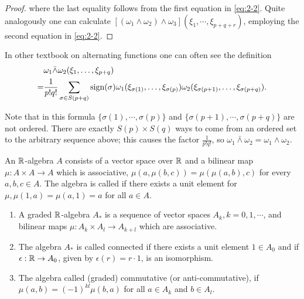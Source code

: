\begin{proof}
  where the last equality follows from the first equation in \eqref{eq:2-2}. Quite analogously one can calculate
  $[(\omega_1\wedge\omega_2)\wedge\omega_3](\xi_1, \cdots, \xi_{p+q+r})$, employing the second equation in \eqref{eq:2-2}.
\end{proof}

\begin{remark}
In other textbook on alternating functions one can often see the definition
\begin{align*}
    & \omega_{1}\bar{\wedge}\omega_{2}(\xi_{1},\ldots,\xi_{p+q})\\
  = & \frac{1}{p!q!}\sum_{\sigma\in S(p+q)}\operatorname{sign}(\sigma)
      \omega_{1}(\xi_{\sigma(1)},\ldots,\xi_{\sigma(p)})
      \omega_{2}(\xi_{\sigma(p+1)},\ldots,\xi_{\sigma(p+q)}).
\end{align*}

Note that in this formula $\{\sigma(1), \cdots,\sigma(p)\}$ and $\{\sigma(p + 1), \cdots, \sigma(p + q)\}$ are not
ordered. There are exactly $S(p)\times S(q)$ ways to come from an ordered set to the arbitrary sequence above; 
this causes the factor $\frac{1}{p!q!}$, so $\omega_1\bar{\wedge}\omega_2 = \omega_1\wedge\omega_2$.
\end{remark}

An $\mathbb{R}$-algebra $A$ consists of a vector space over $\mathbb{R}$ and a bilinear map $\mu:A\times A\to A$
which is associative, $\mu(a, \mu(b,c)) = \mu(\mu(a, b), c)$ for every $a,b,c \in A$. The
algebra is called  if there exists a unit element for $\mu, \mu(1, a) = \mu( a, 1) = a$
for all $a\in A$.

\begin{definition}\;\par
  \begin{enumerate}[label=(\roman*)]
    \item A graded $\mathbb{R}$-algebra $A_*$ is a sequence of vector spaces $A_k, k = 0,1, \cdots$,
      and bilinear maps $\mu:A_k\times A_l\to A_{k+l}$ which are associative.
    \item The algebra $A_*$ is called connected if there exists a unit element $1\in A_0$ and 
      if $\epsilon:\mathbb{R}\to A_0$, given by $\epsilon(r) = r\cdot 1$, is an isomorphism.
    \item The algebra called (graded) commutative (or anti-commutative), if $\mu(a, b) = (-1)^{kl}\mu(b, a)$
      for all $a\in A_k$ and $b\in A_l$.
  \end{enumerate}
\end{definition}


